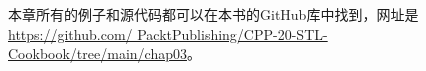 




本章所有的例子和源代码都可以在本书的GitHub库中找到，网址是\url{https://github.com/	PacktPublishing/CPP-20-STL-Cookbook/tree/main/chap03}。


